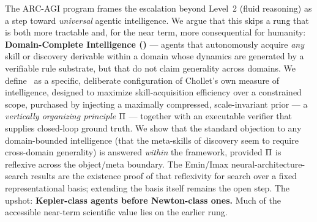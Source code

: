 \noindent The ARC-AGI program frames the escalation beyond Level~2 (fluid reasoning) as a step toward \emph{universal} agentic intelligence. We argue that this skips a rung that is both more tractable and, for the near term, more consequential for humanity: \textbf{Domain-Complete Intelligence (\DCI)} --- agents that autonomously acquire \emph{any} skill or discovery derivable within a domain whose dynamics are generated by a verifiable rule substrate, but that do not claim generality across domains. We define \DCI\ as a specific, deliberate configuration of Chollet's own measure of intelligence, designed to maximize skill-acquisition efficiency over a constrained scope, purchased by injecting a maximally compressed, scale-invariant prior --- a \emph{vertically organizing principle} $\Pi$ --- together with an executable verifier that supplies closed-loop ground truth. We show that the standard objection to any domain-bounded intelligence (that the meta-skills of discovery seem to require cross-domain generality) is answered \emph{within} the framework, provided $\Pi$ is reflexive across the object/meta boundary. The \mbox{Emin/Imax} neural-architecture-search results are the existence proof of that reflexivity for search over a fixed representational basis; extending the basis itself remains the open step. The upshot: \textbf{Kepler-class agents before Newton-class ones.} Much of the accessible near-term scientific value lies on the earlier rung.
